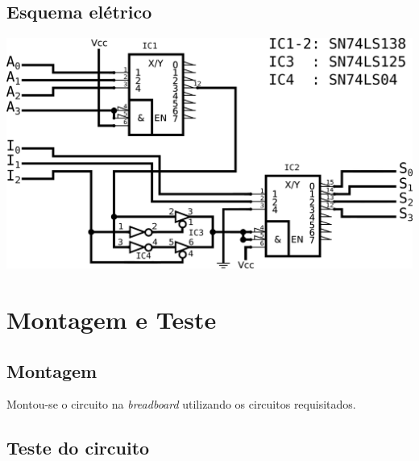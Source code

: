 \documentclass[a4paper,12pt]{article}
\begin{document}
\subsection{Esquema elétrico}
\includegraphics[scale=.1]{esqelect.eps}

\section{Montagem e Teste}
\subsection{Montagem}
Montou-se o circuito na {\it breadboard} utilizando os circuitos requisitados.

\pagebreak
\subsection{Teste do circuito}
\end{document}
